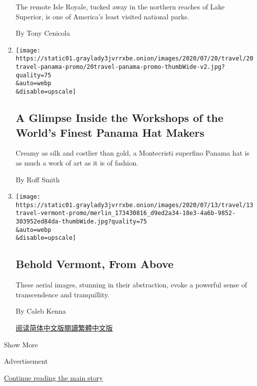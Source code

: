 \begin{enumerate}
  The remote Isle Royale, tucked away in the northern reaches of Lake
  Superior, is one of America's least visited national parks.

  By Tony Cenicola
\item
  \href{/2020/07/20/travel/panama-hats-ecuador.html}{}

  \texttt{[image: https://static01.graylady3jvrrxbe.onion/images/2020/07/20/travel/20travel-panama-promo/20travel-panama-promo-thumbWide-v2.jpg?quality=75\\\&auto=webp\\\&disable=upscale]}

  \hypertarget{a-glimpse-inside-the-workshops-of-the-worlds-finest-panama-hat-makers}{%
  \subsection{A Glimpse Inside the Workshops of the World's Finest
  Panama Hat
  Makers}\label{a-glimpse-inside-the-workshops-of-the-worlds-finest-panama-hat-makers}}

  Creamy as silk and costlier than gold, a Montecristi superfino Panama
  hat is as much a work of art as it is of fashion.

  By Roff Smith
\item
  \href{/2020/07/13/travel/vermont-drone-photographs.html}{}

  \texttt{[image: https://static01.graylady3jvrrxbe.onion/images/2020/07/13/travel/13travel-vermont-promo/merlin\_173430816\_d9ed2a34-18e3-4a6b-9852-303952ed84da-thumbWide.jpg?quality=75\\\&auto=webp\\\&disable=upscale]}

  \hypertarget{behold-vermont-from-above}{%
  \subsection{Behold Vermont, From
  Above}\label{behold-vermont-from-above}}

  These aerial images, stunning in their abstraction, evoke a powerful
  sense of transcendence and tranquillity.

  By Caleb Kenna

  \href{https://cn.nytimes3xbfgragh.onion/travel/20200721/vermont-drone-photographs/}{阅读简体中文版}\href{https://cn.nytimes3xbfgragh.onion/travel/20200721/vermont-drone-photographs/zh-hant/}{閱讀繁體中文版}
\end{enumerate}

Show More

Advertisement

\protect\hyperlink{after-mid1}{Continue reading the main story}

